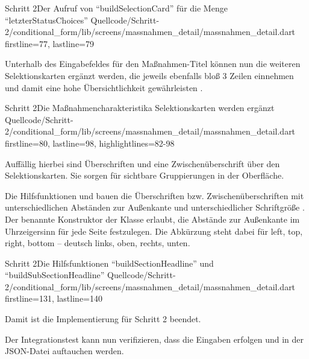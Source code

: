 \begin{alexlisting}{Schritt 2}{Der Aufruf von \enquote{buildSelectionCard} für die Menge \enquote{letzterStatusChoices}}
  {Quellcode/Schritt-2/conditional_form/lib/screens/massnahmen_detail/massnahmen_detail.dart}
  {firstline=77, lastline=79}
  \label{lst:Schritt2BuildSelectionCardLetzterStatusChoices}
\end{alexlisting}

Unterhalb des Eingabefeldes für den Maßnahmen-Titel können nun die weiteren Selektionskarten ergänzt werden, die jeweils ebenfalls bloß 3 Zeilen einnehmen und damit eine hohe Übersichtlichkeit gewährleisten .

\begin{alexlisting}{Schritt 2}{Die Maßnahmencharakteristika Selektionskarten werden ergänzt}
  {Quellcode/Schritt-2/conditional_form/lib/screens/massnahmen_detail/massnahmen_detail.dart}
  {firstline=80, lastline=98, highlightlines={82-98}}
  \label{lst:Schritt2MassnahmencharakteristikaSelektionskartenWerdenErgaenzt}
\end{alexlisting}

Auffällig hierbei sind Überschriften  und eine Zwischenüberschrift  über den Selektionskarten. Sie sorgen für sichtbare Gruppierungen in der Oberfläche.

Die Hilfsfunktionen  und  bauen die Überschriften  bzw. Zwischenüberschriften  mit unterschiedlichen Abständen zur Außenkante  und unterschiedlicher Schriftgröße . Der benannte Konstruktor  der Klasse  erlaubt, die Abstände zur Außenkante im Uhrzeigersinn für jede Seite festzulegen. Die Abkürzung  steht dabei für left, top, right, bottom -- deutsch links, oben, rechts, unten.

\begin{alexlisting}{Schritt 2}{Die Hilfsfunktionen \enquote{buildSectionHeadline} und \enquote{buildSubSectionHeadline}}
  {Quellcode/Schritt-2/conditional_form/lib/screens/massnahmen_detail/massnahmen_detail.dart}
  {firstline=131, lastline=140}
  \label{lst:Schritt2buildSectionHeadlineBuildSubSectionHeadline}
\end{alexlisting}

Damit ist die Implementierung für Schritt 2 beendet.

Der Integrationstest kann nun verifizieren, dass die Eingaben erfolgen und in der JSON-Datei auftauchen werden.

